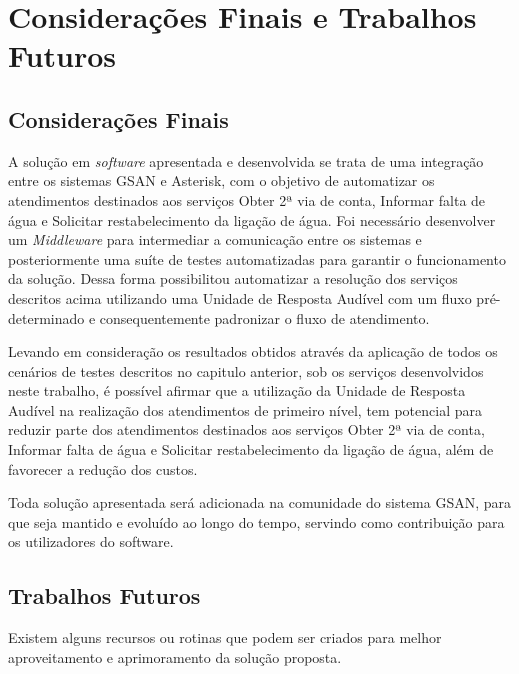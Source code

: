 \chapter[Considerações Finais e Trabalhos Futuros]{\textbf{C}onsiderações Finais e \textbf{T}rabalhos Futuros}

\section{Considerações Finais}
A solução em \textit{software} apresentada e desenvolvida se trata de uma integração entre os sistemas GSAN e Asterisk, com o objetivo de automatizar os atendimentos destinados aos serviços Obter 2ª via de conta, Informar falta de água e Solicitar restabelecimento da ligação de água. Foi necessário desenvolver um \textit{Middleware} para intermediar a comunicação entre os sistemas e posteriormente uma suíte de testes automatizadas para garantir o funcionamento da solução. Dessa forma possibilitou automatizar a resolução dos serviços descritos acima utilizando uma Unidade de Resposta Audível com um fluxo pré-determinado e consequentemente padronizar o fluxo de atendimento.

Levando em consideração os resultados obtidos através da aplicação de todos os cenários de testes descritos no capitulo anterior, sob os serviços desenvolvidos neste trabalho, é possível afirmar que a utilização da Unidade de Resposta Audível na realização dos atendimentos de primeiro nível, tem potencial para reduzir parte dos atendimentos destinados aos serviços Obter 2ª via de conta, Informar falta de água e Solicitar restabelecimento da ligação de água, além de favorecer a redução dos custos.

Toda solução apresentada será adicionada na comunidade do sistema GSAN, para que seja mantido e evoluído ao longo do tempo, servindo como contribuição para os utilizadores do software.

\section{Trabalhos Futuros}

Existem alguns recursos ou rotinas que podem ser criados para melhor aproveitamento e aprimoramento da solução proposta.

